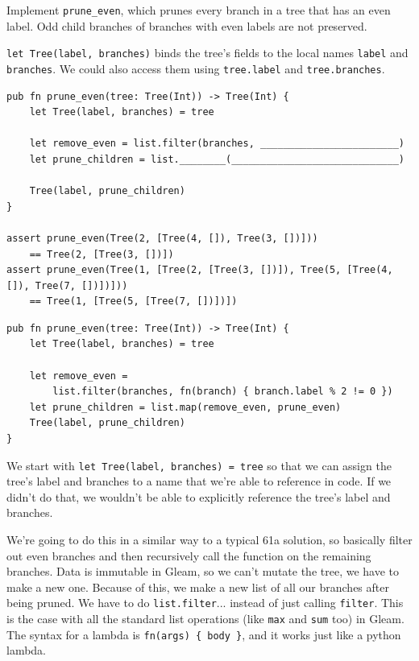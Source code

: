 \begin{blocksection}
\question Implement \texttt{prune\_even}, which prunes every branch in a tree that has
an even label. Odd child branches of branches with even labels are not preserved.

\texttt{let Tree(label, branches)} binds the tree's fields to the local names \texttt{label} and \texttt{branches}. We could also access them using \texttt{tree.label} and \texttt{tree.branches}.
\newline
\begin{lstlisting}
pub fn prune_even(tree: Tree(Int)) -> Tree(Int) {
    let Tree(label, branches) = tree

    let remove_even = list.filter(branches, ________________________)
    let prune_children = list.________(_____________________________)

    Tree(label, prune_children)
}

assert prune_even(Tree(2, [Tree(4, []), Tree(3, [])])) 
    == Tree(2, [Tree(3, [])])
assert prune_even(Tree(1, [Tree(2, [Tree(3, [])]), Tree(5, [Tree(4, []), Tree(7, [])])]))
    == Tree(1, [Tree(5, [Tree(7, [])])])
\end{lstlisting}
\begin{solution}
\begin{lstlisting}
pub fn prune_even(tree: Tree(Int)) -> Tree(Int) {
    let Tree(label, branches) = tree

    let remove_even =
        list.filter(branches, fn(branch) { branch.label % 2 != 0 })
    let prune_children = list.map(remove_even, prune_even)
    Tree(label, prune_children)
}
\end{lstlisting}
\end{solution}
\begin{questionmeta}
    We start with \lstinline{let Tree(label, branches) = tree} so that we can assign the tree's label and branches to a name that we're able to reference in code. 
    If we didn't do that, we wouldn't be able to explicitly reference the tree's label and branches.
    
    We're going to do this in a similar way to a typical 61a solution, so basically filter out even branches and then recursively call the function on the remaining branches.
    Data is immutable in Gleam, so we can't mutate the tree, we have to make a new one. Because of this, we make a new list of all our branches after being pruned. We have to do \lstinline{list.filter}... instead of just calling \lstinline{filter}. This is the case with all the standard list operations (like \lstinline{max} and \lstinline{sum} too) in Gleam.
    The syntax for a lambda is \lstinline|fn(args) { body }|, and it works just like a python lambda.
    

\end{questionmeta}
\end{blocksection}
